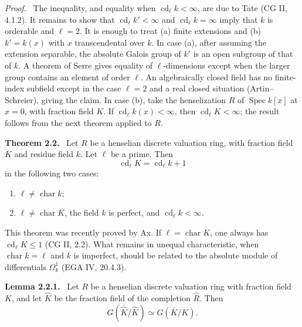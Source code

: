 \documentclass[11pt]{article}
\newcommand{\Spec}{\operatorname{Spec}}
\newenvironment{statement}[1]{\par\medskip\noindent\textbf{#1.}\ }{\par\medskip}
\newenvironment{prooftext}{\par\noindent\emph{Proof.}\ }{\par\medskip}
\begin{document}
\begin{prooftext}
The inequality, and equality when \(\operatorname{cd}_\ell k<\infty\), are due to Tate (CG II, 4.1.2). It remains to show that \(\operatorname{cd}_\ell k'<\infty\) and \(\operatorname{cd}_\ell k=\infty\) imply that \(k\) is orderable and \(\ell=2\). It is enough to treat (a) finite extensions and (b) \(k'=k(x)\) with \(x\) transcendental over \(k\). In case (a), after assuming the extension separable, the absolute Galois group of \(k'\) is an open subgroup of that of \(k\). A theorem of Serre gives equality of \(\ell\)-dimensions except when the larger group contains an element of order \(\ell\). An algebraically closed field has no finite-index subfield except in the case \(\ell=2\) and a real closed situation (Artin--Schreier), giving the claim. In case (b), take the henselization \(R\) of \(\Spec k[x]\) at \(x=0\), with fraction field \(K\). If \(\operatorname{cd}_\ell k(x)<\infty\), then \(\operatorname{cd}_\ell K<\infty\); the result follows from the next theorem applied to \(R\).
\end{prooftext}

\begin{statement}{Theorem 2.2}
Let \(R\) be a henselian discrete valuation ring, with fraction field \(K\) and residue field \(k\). Let \(\ell\) be a prime. Then
\[
\operatorname{cd}_\ell K=\operatorname{cd}_\ell k+1
\]
in the following two cases:
\begin{enumerate}[label=(\roman*)]
\item \(\ell\ne\operatorname{char}k\);
\item \(\ell\ne\operatorname{char}K\), the field \(k\) is perfect, and \(\operatorname{cd}_\ell k<\infty\).
\end{enumerate}
\end{statement}

This theorem was recently proved by Ax. If \(\ell=\operatorname{char}K\), one always has \(\operatorname{cd}_\ell K\leq1\) (CG II, 2.2). What remains in unequal characteristic, when \(\operatorname{char}k=\ell\) and \(k\) is imperfect, should be related to the absolute module of differentials \(\Omega^1_k\) (EGA IV, 20.4.3).

\begin{statement}{Lemma 2.2.1}
Let \(R\) be a henselian discrete valuation ring with fraction field \(K\), and let \(\widehat K\) be the fraction field of the completion \(\widehat R\). Then
\[
G(\overline{\widehat K}/\widehat K)\simeq G(\bar K/K).
\]
\end{statement}
\end{document}
